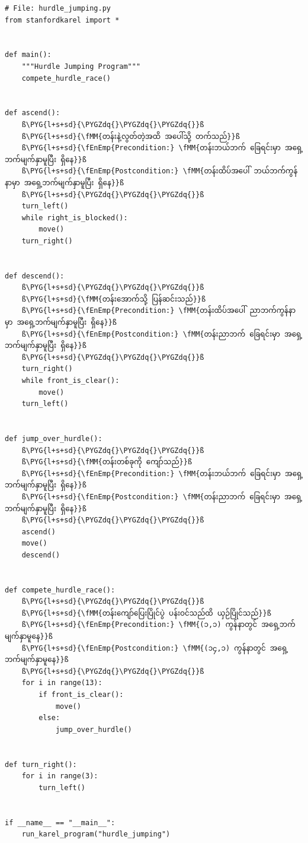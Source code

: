 %
\setlength{\fboxsep}{0pt}
\begin{verbatim}
# File: hurdle_jumping.py
from stanfordkarel import *


def main():
    """Hurdle Jumping Program"""
    compete_hurdle_race()


def ascend():
    ß\PYG{l+s+sd}{\PYGZdq{}\PYGZdq{}\PYGZdq{}}ß
    ß\PYG{l+s+sd}{\fMM{တန်းနဲ့လွတ်တဲ့အထိ အပေါ်သို့ တက်သည်}}ß
    ß\PYG{l+s+sd}{\fEnEmp{Precondition:} \fMM{တန်းဘယ်ဘက် ခြေရင်းမှာ အရှေ့ဘက်မျက်နှာမူပြီး ရှိနေ}}ß
    ß\PYG{l+s+sd}{\fEnEmp{Postcondition:} \fMM{တန်းထိပ်အပေါ် ဘယ်ဘက်ကွန်နာမှာ အရှေ့ဘက်မျက်နှာမူပြီး ရှိနေ}}ß
    ß\PYG{l+s+sd}{\PYGZdq{}\PYGZdq{}\PYGZdq{}}ß
    turn_left()
    while right_is_blocked():
        move()
    turn_right()


def descend():
    ß\PYG{l+s+sd}{\PYGZdq{}\PYGZdq{}\PYGZdq{}}ß
    ß\PYG{l+s+sd}{\fMM{တန်းအောက်သို့ ပြန်ဆင်းသည်}}ß
    ß\PYG{l+s+sd}{\fEnEmp{Precondition:} \fMM{တန်းထိပ်အပေါ် ညာဘက်ကွန်နာမှာ အရှေ့ဘက်မျက်နှာမူပြီး ရှိနေ}}ß
    ß\PYG{l+s+sd}{\fEnEmp{Postcondition:} \fMM{တန်းညာဘက် ခြေရင်းမှာ အရှေ့ဘက်မျက်နှာမူပြီး ရှိနေ}}ß
    ß\PYG{l+s+sd}{\PYGZdq{}\PYGZdq{}\PYGZdq{}}ß
    turn_right()
    while front_is_clear():
        move()
    turn_left()


def jump_over_hurdle():
    ß\PYG{l+s+sd}{\PYGZdq{}\PYGZdq{}\PYGZdq{}}ß
    ß\PYG{l+s+sd}{\fMM{တန်းတစ်ခုကို ကျော်သည်}}ß
    ß\PYG{l+s+sd}{\fEnEmp{Precondition:} \fMM{တန်းဘယ်ဘက် ခြေရင်းမှာ အရှေ့ဘက်မျက်နှာမူပြီး ရှိနေ}}ß
    ß\PYG{l+s+sd}{\fEnEmp{Postcondition:} \fMM{တန်းညာဘက် ခြေရင်းမှာ အရှေ့ဘက်မျက်နှာမူပြီး ရှိနေ}}ß
    ß\PYG{l+s+sd}{\PYGZdq{}\PYGZdq{}\PYGZdq{}}ß
    ascend()
    move()
    descend()


def compete_hurdle_race():
    ß\PYG{l+s+sd}{\PYGZdq{}\PYGZdq{}\PYGZdq{}}ß
    ß\PYG{l+s+sd}{\fMM{တန်းကျော်ပြေးပြိုင်ပွဲ ပန်းဝင်သည်ထိ ယှဉ်ပြိုင်သည်}}ß
    ß\PYG{l+s+sd}{\fEnEmp{Precondition:} \fMM{(၁,၁) ကွန်နာတွင် အရှေ့ဘက်မျက်နှာမူနေ}}ß
    ß\PYG{l+s+sd}{\fEnEmp{Postcondition:} \fMM{(၁၄,၁) ကွန်နာတွင် အရှေ့ဘက်မျက်နှာမူနေ}}ß
    ß\PYG{l+s+sd}{\PYGZdq{}\PYGZdq{}\PYGZdq{}}ß
    for i in range(13):
        if front_is_clear():
            move()
        else:
            jump_over_hurdle()


def turn_right():
    for i in range(3):
        turn_left()


if __name__ == "__main__":
    run_karel_program("hurdle_jumping")

\end{verbatim}
%


